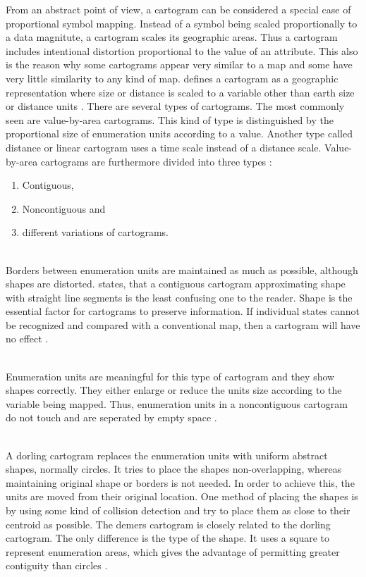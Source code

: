 From an abstract point of view, a cartogram can be considered a special case of proportional symbol mapping. Instead of a symbol being scaled proportionally to a data magnitute, a cartogram scales its geographic areas. Thus a cartogram includes intentional distortion proportional to the value of an attribute. This also is the reason why some cartograms appear very similar to a map and some have very little similarity to any kind of map. \citeauthor{Tyner2010} defines a cartogram as a geographic representation where size or distance is scaled to a variable other than earth size or distance units .
There are several types of cartograms. The most commonly seen are value-by-area cartograms. This kind of type is distinguished by the proportional size of enumeration units according to a value. Another type called distance or linear cartogram uses a time scale instead of a distance scale. Value-by-area cartograms are furthermore divided into three types :
\begin{enumerate}
\item Contiguous,
\item Noncontiguous and
\item different variations of cartograms.
\end{enumerate}

\begin{enumerate}

 \hfill \\
Borders between enumeration units are maintained as much as possible, although shapes are distorted. \citeauthor{Tyner2010} states, that a contiguous cartogram approximating shape with straight line segments is the least confusing one to the reader. Shape is the essential factor for cartograms to preserve information. If individual states cannot be recognized and compared with a conventional map, then a cartogram will have no effect .

 \hfill \\
Enumeration units are meaningful for this type of cartogram and they show shapes correctly. They either enlarge or reduce the units size according to the variable being mapped. Thus, enumeration units in a noncontiguous cartogram do not touch and are seperated by empty space .

 \hfill \\
A dorling cartogram replaces the enumeration units with uniform abstract shapes, normally circles. It tries to place the shapes non-overlapping, whereas maintaining original shape or borders is not needed. In order to achieve this, the units are moved from their original location. One method of placing the shapes is by using some kind of collision detection and try to place them as close to their centroid as possible. The demers cartogram is closely related to the dorling cartogram. The only difference is the type of the shape. It uses a square to represent enumeration areas, which gives the advantage of permitting greater contiguity than circles .

\end{enumerate}

